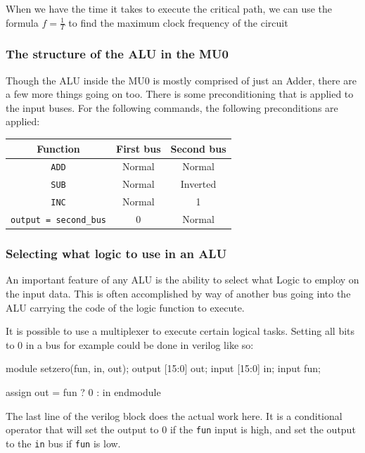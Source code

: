 \documentclass{article}
\begin{document}
When we have the time it takes to execute the critical path, we can use the
formula $f = \frac{1}{T}$ to find the maximum clock frequency of the circuit

\subsubsection{The structure of the ALU in the MU0}

Though the ALU inside the MU0 is mostly comprised of just an Adder, there are a
few more things going on too. There is some preconditioning that is applied to
the input buses. For the following commands, the following preconditions are
applied:

\begin{center}
	\begin{tabular}{|c|c|c|}
		\hline
		{\bf Function} & {\bf First bus} & {\bf Second bus}\\ \hline
		{\tt ADD} & Normal & Normal\\ \hline
		{\tt SUB} & Normal & Inverted\\ \hline
		{\tt INC} & Normal & 1\\ \hline
		{\tt output = second\_bus} & 0 & Normal\\ \hline
	\end{tabular}
\end{center}



\subsubsection*{Selecting what logic to use in an ALU}

An important feature of any ALU is the ability to select what Logic to employ on
the input data. This is often accomplished by way of another bus going into the
ALU carrying the code of the logic function to execute.

It is possible to use a multiplexer to execute certain logical tasks. Setting
all bits to 0 in a bus for example could be done in verilog like so:

\begin{listing}{1}
module setzero(fun, in, out);
	output [15:0] out;
	input [15:0] in;
	input fun;

	assign out = fun ? 0 : in
endmodule
\end{listing}

The last line of the verilog block does the actual work here. It is a
conditional operator that will set the output to 0 if the {\tt fun} input is
high, and set the output to the {\tt in} bus if {\tt fun} is low.
\end{document}
